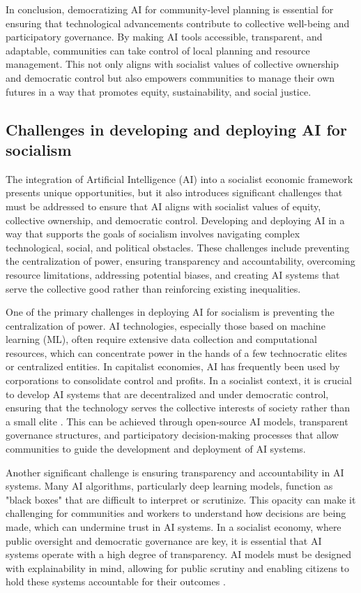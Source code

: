 \begin{refsection}
In conclusion, democratizing AI for community-level planning is essential for ensuring that technological advancements contribute to collective well-being and participatory governance. By making AI tools accessible, transparent, and adaptable, communities can take control of local planning and resource management. This not only aligns with socialist values of collective ownership and democratic control but also empowers communities to manage their own futures in a way that promotes equity, sustainability, and social justice.

\subsection{Challenges in developing and deploying AI for socialism}

The integration of Artificial Intelligence (AI) into a socialist economic framework presents unique opportunities, but it also introduces significant challenges that must be addressed to ensure that AI aligns with socialist values of equity, collective ownership, and democratic control. Developing and deploying AI in a way that supports the goals of socialism involves navigating complex technological, social, and political obstacles. These challenges include preventing the centralization of power, ensuring transparency and accountability, overcoming resource limitations, addressing potential biases, and creating AI systems that serve the collective good rather than reinforcing existing inequalities.

One of the primary challenges in deploying AI for socialism is preventing the centralization of power. AI technologies, especially those based on machine learning (ML), often require extensive data collection and computational resources, which can concentrate power in the hands of a few technocratic elites or centralized entities. In capitalist economies, AI has frequently been used by corporations to consolidate control and profits. In a socialist context, it is crucial to develop AI systems that are decentralized and under democratic control, ensuring that the technology serves the collective interests of society rather than a small elite \cite[pp.~56-59]{tapscott2016}. This can be achieved through open-source AI models, transparent governance structures, and participatory decision-making processes that allow communities to guide the development and deployment of AI systems.

Another significant challenge is ensuring transparency and accountability in AI systems. Many AI algorithms, particularly deep learning models, function as "black boxes" that are difficult to interpret or scrutinize. This opacity can make it challenging for communities and workers to understand how decisions are being made, which can undermine trust in AI systems. In a socialist economy, where public oversight and democratic governance are key, it is essential that AI systems operate with a high degree of transparency. AI models must be designed with explainability in mind, allowing for public scrutiny and enabling citizens to hold these systems accountable for their outcomes \cite[pp.~45-47]{mazzucato2023}.


\end{refsection}
